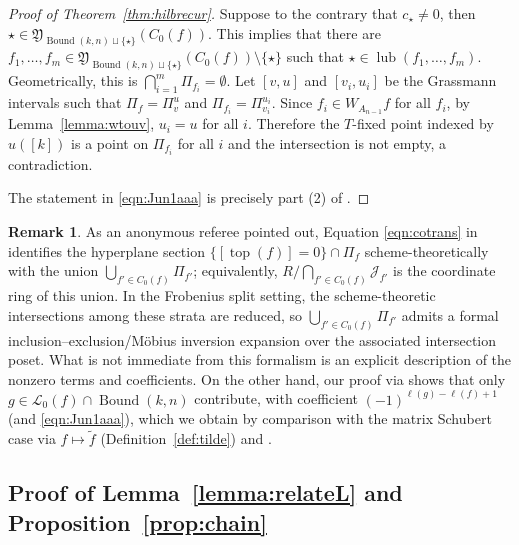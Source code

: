 \documentclass[12pt,reqno]{amsart}
\theoremstyle{definition}
\newtheorem{remark}[lemma]{Remark}
\newcommand{\cJ}{\mathcal{J}}
\newcommand{\topp}{\operatorname{top}}
\newcommand{\bound}{\operatorname{Bound}}
\newcommand{\lub}{\operatorname{lub}}
\newcommand{\genP}{\mathfrak{Y}}
\newcommand{\Lenart}{\mathcal{L}}
\begin{document}
{\begin{proof}[Proof of Theorem~\ref{thm:hilbrecur}]
Suppose to the contrary that $c_\star\neq 0$, then $\star \in \genP_{\bound(k,n)\sqcup \{\star\}}(C_0(f))$. This implies that there are $f_1,\dots,f_m\in \genP_{\bound(k,n)\sqcup \{\star\}}(C_0(f))\setminus \{\star\}$ such that $\star \in \lub(f_1,\dots,f_m)$. Geometrically, this is 
$\bigcap_{i = 1}^m \Pi_{f_i} = \emptyset$.
Let $[v,u]$ and $[v_i,u_i]$ be the Grassmann intervals such that $\Pi_{f} = \Pi_v^u$ and $\Pi_{f_i} = \Pi_{v_i}^{u_i}$. Since $f_i\in W_{A_{n-1}}f$ for all $f_i$, by Lemma~\ref{lemma:wtouv}, $u_i = u$ for all $i$. Therefore the $T$-fixed point indexed by $u([k])$ is a point on $\Pi_{f_i}$ for all $i$ and the intersection is not empty, a contradiction. 

The statement in \eqref{eqn:Jun1aaa} is precisely part (2) of .
\end{proof}

\begin{remark}
As an anonymous referee pointed out, Equation \eqref{eqn:cotrans} in   identifies the hyperplane section
$\{[\topp(f)]=0\}\cap \Pi_f$ scheme-theoretically with the union $\bigcup_{f'\in C_0(f)}\Pi_{f'}$; equivalently, $R/\bigcap_{f'\in C_0(f)}\cJ_{f'}$ is the coordinate ring of this union.
In the Frobenius split setting, the scheme-theoretic intersections among these strata are reduced, so
$\bigcup_{f'\in C_0(f)}\Pi_{f'}$ admits a formal inclusion--exclusion/M\"obius inversion expansion over the associated
intersection poset.
What is not immediate from this formalism is an explicit description of the nonzero terms and coefficients. On the other hand, our proof via
 shows that only $g\in \Lenart_0(f)\cap\bound(k,n)$ contribute, with coefficient
$(-1)^{\ell(g)-\ell(f)+1}$ (and \eqref{eqn:Jun1aaa}), which we obtain by comparison with the matrix Schubert case via
$f\mapsto \widetilde f$ (Definition~\ref{def:tilde}) and .
\end{remark}


\subsection{Proof of Lemma~\ref{lemma:relateL} and Proposition~\ref{prop:chain}}
\label{subsec:proof}

}
\end{document}
